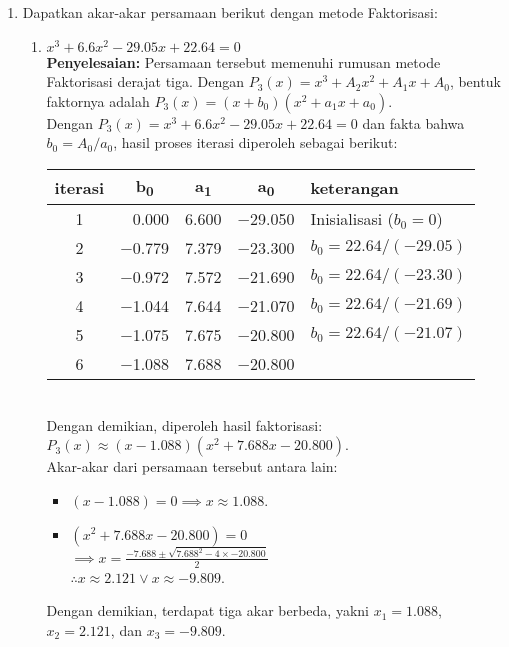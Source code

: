 \documentclass{article}
\newcommand{\penyelesaian}{\textbf{Penyelesaian: }}
\begin{document}
\begin{enumerate}
    \item Dapatkan akar-akar persamaan berikut dengan metode Faktorisasi: 
    \begin{enumerate}
        \item $x^3 + \num{6,6}x^2 - \num{29,05}x + \num{22,64} = 0$ \\
        \penyelesaian Persamaan tersebut memenuhi rumusan metode Faktorisasi derajat tiga.
        Dengan $P_3(x) = x^3 + A_2x^2 + A_1x + A_0$, bentuk faktornya adalah $P_3(x) = (x + b_0)(x^2 + a_1x + a_0)$. \\

        Dengan $P_3(x) = x^3 + \num{6,6}x^2 - \num{29,05}x + \num{22,64} = 0$ dan fakta bahwa $b_0 = A_0/a_0$, hasil proses iterasi diperoleh sebagai berikut: \\
        \begin{tabular}{|c|r|r|r|l|}
            \hline
            \textbf{iterasi} & \multicolumn{1}{c|}{\textbf{b\textsubscript{0}}} & \multicolumn{1}{c|}{\textbf{a\textsubscript{1}}} & \multicolumn{1}{c|}{\textbf{a\textsubscript{0}}} & \textbf{keterangan} \\ \hline
            1 & \num{0,000} & \num{6,600} & \num{-29,050} & Inisialisasi ($b_0 = 0$) \\ \hline
            2 & \num{-0,779} & \num{7,379} & \num{-23,300} & $b_0 = \num{22,64}/(\num{-29,05})$ \\ \hline
            3 & \num{-0,972} & \num{7,572} & \num{-21,690} & $b_0 = \num{22,64}/(\num{-23,30})$ \\ \hline
            4 & \num{-1,044} & \num{7,644} & \num{-21,070} & $b_0 = \num{22,64}/(\num{-21,69})$ \\ \hline
            5 & \num{-1,075} & \num{7,675} & \num{-20,800} & $b_0 = \num{22,64}/(\num{-21,07})$ \\ \hline
            6 & \num{-1,088} & \num{7,688} & \num{-20,800} &  \\ \hline
        \end{tabular} \\
        Dengan demikian, diperoleh hasil faktorisasi: $P_3(x) \approx (x - \num{1,088})(x^2 + \num{7,688}x - \num{20,800})$. \\
        
        Akar-akar dari persamaan tersebut antara lain:
        \begin{itemize}
            \item $(x - \num{1,088}) = 0 \implies x \approx \num{1,088}$.
            \item $(x^2 + \num{7,688}x - \num{20,800}) = 0$ \\
            $ \implies x = \frac{-\num{7,688} \pm \sqrt{\num{7,688}^2 - 4 \times \num{-20,800}}}{2}$ \\
            $ \therefore x \approx \num{2,121} \vee x \approx \num{-9,809}$.
        \end{itemize} 
        Dengan demikian, terdapat tiga akar berbeda, yakni $x_1 = \num{1,088}$, $x_2 = \num{2,121}$, dan $x_3 = \num{-9,809}$.



\end{enumerate}
\end{enumerate}
\end{document}
